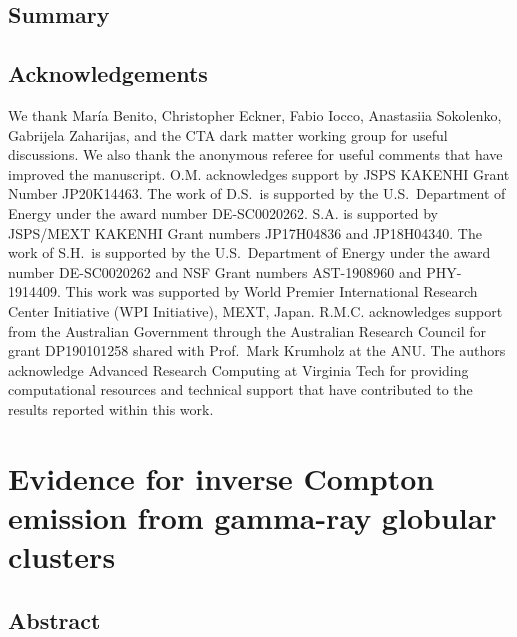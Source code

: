 \documentclass[doublespace,nopageskip]{VTthesis} %
\begin{document}


\section{Summary}

\section*{Acknowledgements}

We thank Mar\'ia Benito, Christopher Eckner, Fabio Iocco,  Anastasiia Sokolenko, Gabrijela Zaharijas, and the CTA dark matter working group for useful discussions. We also thank the anonymous referee for useful comments that have improved the manuscript. O.M. acknowledges support by JSPS KAKENHI Grant Number JP20K14463.  The work of D.S.\ is supported by the U.S.\ Department of Energy under the award number DE-SC0020262.
S.A. is supported by JSPS/MEXT KAKENHI Grant numbers JP17H04836 and JP18H04340.
The work of S.H.\ is supported by the U.S.\ Department of Energy under the award number DE-SC0020262 and NSF Grant numbers AST-1908960 and PHY-1914409. This work was supported by World Premier International Research Center Initiative (WPI Initiative), MEXT, Japan. R.M.C. acknowledges support from the Australian Government through the Australian Research Council for grant DP190101258 shared with Prof.~Mark Krumholz at the ANU. The authors acknowledge Advanced Research Computing at Virginia Tech for providing computational resources and technical support that have contributed to the results reported within this work.

\chapter{Evidence for inverse Compton emission from gamma-ray globular clusters} \label{ch:globular_cluster}

\section{Abstract}
\end{document}
